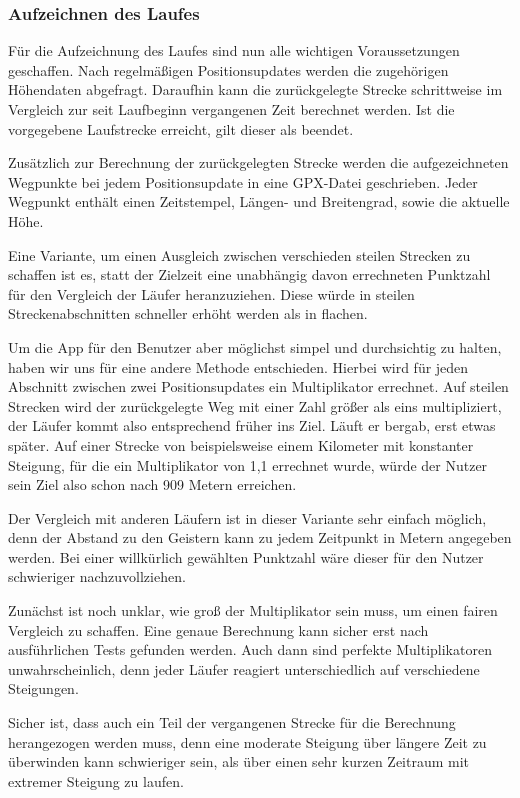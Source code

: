 \subsubsection{Aufzeichnen des Laufes}
Für die Aufzeichnung des Laufes sind nun alle wichtigen Voraussetzungen geschaffen. Nach regelmäßigen Positionsupdates werden die zugehörigen Höhendaten abgefragt. Daraufhin kann die zurückgelegte Strecke schrittweise im Vergleich zur seit Laufbeginn vergangenen Zeit berechnet werden. Ist die vorgegebene Laufstrecke erreicht, gilt dieser als beendet.

Zusätzlich zur Berechnung der zurückgelegten Strecke werden die aufgezeichneten Wegpunkte bei jedem Positionsupdate in eine GPX-Datei geschrieben. Jeder Wegpunkt enthält einen Zeitstempel, Längen- und Breitengrad, sowie die aktuelle Höhe.

Eine Variante, um einen Ausgleich zwischen verschieden steilen Strecken zu schaffen ist es, statt der Zielzeit eine unabhängig davon errechneten Punktzahl für den Vergleich der Läufer heranzuziehen. Diese würde in steilen Streckenabschnitten schneller erhöht werden als in flachen.

Um die App für den Benutzer aber möglichst simpel und durchsichtig zu halten, haben wir uns für eine andere Methode entschieden. Hierbei wird für jeden Abschnitt zwischen zwei Positionsupdates ein Multiplikator errechnet. Auf steilen Strecken wird der zurückgelegte Weg mit einer Zahl größer als eins multipliziert, der Läufer kommt also entsprechend früher ins Ziel. Läuft er bergab, erst etwas später. Auf einer Strecke von beispielsweise einem Kilometer mit konstanter Steigung, für die ein Multiplikator von 1,1 errechnet wurde, würde der Nutzer sein Ziel also schon nach 909 Metern erreichen.

Der Vergleich mit anderen Läufern ist in dieser Variante sehr einfach möglich, denn der Abstand zu den Geistern kann zu jedem Zeitpunkt in Metern angegeben werden. Bei einer willkürlich gewählten Punktzahl wäre dieser für den Nutzer schwieriger nachzuvollziehen.

Zunächst ist noch unklar, wie groß der Multiplikator sein muss, um einen fairen Vergleich zu schaffen. Eine genaue Berechnung kann sicher erst nach ausführlichen Tests gefunden werden. Auch dann sind perfekte Multiplikatoren unwahrscheinlich, denn jeder Läufer reagiert unterschiedlich auf verschiedene Steigungen.

Sicher ist, dass auch ein Teil der vergangenen Strecke für die Berechnung herangezogen werden muss, denn eine moderate Steigung über längere Zeit zu überwinden kann schwieriger sein, als über einen sehr kurzen Zeitraum mit extremer Steigung zu laufen.
